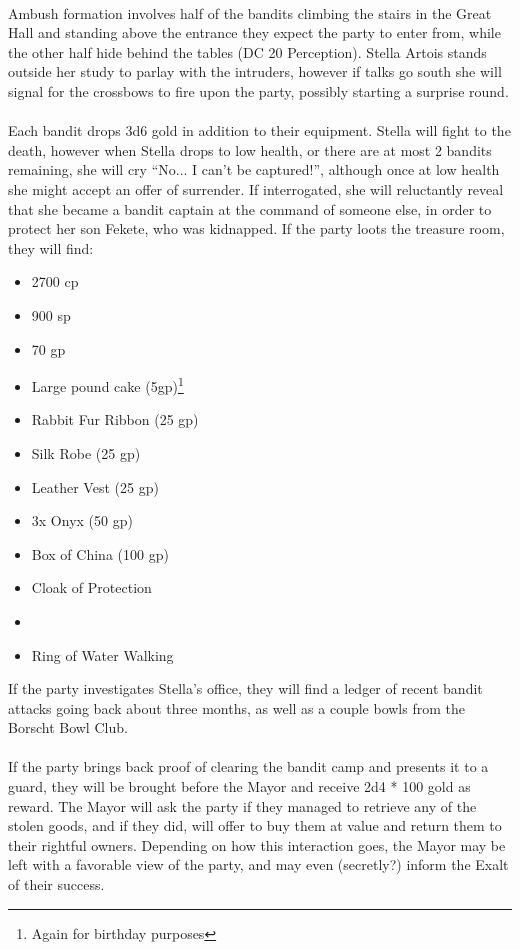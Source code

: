 \\
Ambush formation involves half of the bandits climbing the stairs in the Great Hall and standing above the entrance they expect the party to enter from, while the other half hide behind the tables (DC 20 Perception). Stella Artois stands outside her study to parlay with the intruders, however if talks go south she will signal for the crossbows to fire upon the party, possibly starting a surprise round. \\
\\
Each bandit drops 3d6 gold in addition to their equipment. Stella will fight to the death, however when Stella drops to low health, or there are at most 2 bandits remaining, she will cry ``No... I can't be captured!'', although once at low health she might accept an offer of surrender. If interrogated, she will reluctantly reveal that she became a bandit captain at the command of someone else, in order to protect her son Fekete, who was kidnapped. If the party loots the treasure room, they will find:
\begin{itemize}
\item 2700 cp
\item 900 sp
\item 70 gp
\item Large pound cake (5gp)\footnote{Again for birthday purposes}
\item Rabbit Fur Ribbon (25 gp)
\item Silk Robe (25 gp)
\item Leather Vest (25 gp)
\item 3x Onyx (50 gp)
\item Box of China (100 gp)
\item Cloak of Protection
\item {}
\item Ring of Water Walking
\end{itemize}

If the party investigates Stella's office, they will find a ledger of recent bandit attacks going back about three months, as well as a couple bowls from the Borscht Bowl Club.\\
\\
If the party brings back proof of clearing the bandit camp and presents it to a guard, they will be brought before the Mayor and receive 2d4 * 100 gold as reward. The Mayor will ask the party if they managed to retrieve any of the stolen goods, and if they did, will offer to buy them at value and return them to their rightful owners. Depending on how this interaction goes, the Mayor may be left with a favorable view of the party, and may even (secretly?) inform the Exalt of their success.